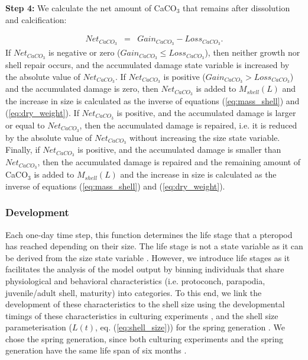 \textbf{Step 4:} We calculate the net amount of CaCO$_3$ that remains after dissolution and calcification:

{\scriptsize
\begin{eqnarray}
Net_{CaCO_3} & = & Gain_{CaCO_3} - Loss_{CaCO_3}.
\end{eqnarray}}
\noindent
If $Net_{CaCO_3}$ is negative or zero ($Gain_{CaCO_3} \leq Loss_{CaCO_3}$), then neither growth nor shell repair occurs, and the accumulated damage state variable is increased by the absolute value of $Net_{CaCO_3}$. If $Net_{CaCO_3}$ is positive ($Gain_{CaCO_3} > Loss_{CaCO_3}$) and the accumulated damage is zero, then $Net_{CaCO_3}$ is added to  $M_{shell}(L)$ and the increase in size is calculated as the inverse of equations (\ref{eq:mass_shell}) and (\ref{eq:dry_weight}). If $Net_{CaCO_3}$ is positive, and the accumulated damage is larger or equal to  $Net_{CaCO_3}$, then the accumulated damage is repaired, i.e. it is reduced by the absolute value of $Net_{CaCO_3}$ without increasing the size state variable. Finally, if $Net_{CaCO_3}$ is positive, and the accumulated damage is smaller than $Net_{CaCO_3}$, then the accumulated damage is repaired and the remaining amount of CaCO$_3$ is added to  $M_{shell}(L)$ and the increase in size is calculated as the inverse of equations (\ref{eq:mass_shell}) and (\ref{eq:dry_weight}).



\subsubsection{Development}
Each one-day time step, this function determines the life stage that a pteropod has reached depending on their size. The life stage is not a state variable as it can be derived from the size state variable \citep{Grimm2010UpdateODD}. However, we introduce life stages as it facilitates the analysis of the model output by binning individuals that share physiological and behavioral characteristics (i.e. protoconch, parapodia, juvenile/adult shell, maturity) into categories. To this end, we link the development of these characteristics to the shell size using the developmental timings of these characteristics in culturing experiments \citep{Howes2014Lab,Thabet2015Lifestages}, and the shell size parameterisation ($L(t)$, eq. (\ref{eq:shell_size})) for the spring generation \citep{Wang2017Lifecycle}. We chose the spring generation, since both culturing experiments and the spring generation have the same life span of six months \citep{Howes2014Lab,Thabet2015Lifestages,Wang2017Lifecycle}. 

